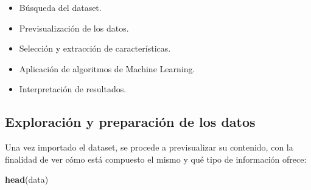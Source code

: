 \documentclass[]{article}
\newenvironment{Shaded}{\begin{snugshade}}{\end{snugshade}}
\newcommand{\KeywordTok}[1]{\textcolor[rgb]{0.13,0.29,0.53}{\textbf{#1}}}
\newcommand{\NormalTok}[1]{#1}
\begin{document}
\begin{itemize}
\item
  Búsqueda del dataset.
\item
  Previsualización de los datos.
\item
  Selección y extracción de características.
\item
  Aplicación de algoritmos de Machine Learning.
\item
  Interpretación de resultados.
\end{itemize}

\hypertarget{exploraciuxf3n-y-preparaciuxf3n-de-los-datos}{%
\subsection{Exploración y preparación de los
datos}\label{exploraciuxf3n-y-preparaciuxf3n-de-los-datos}}

Una vez importado el dataset, se procede a previsualizar su contenido,
con la finalidad de ver cómo está compuesto el mismo y qué tipo de
información ofrece:

\begin{Shaded}
\begin{Highlighting}[]
\KeywordTok{head}\NormalTok{(data)}
\end{Highlighting}
\end{Shaded}
\end{document}
